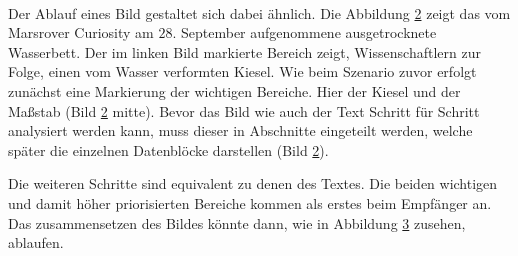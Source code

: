 \begin{figure}[H]
	\centering
	\hfill
	\\
	\label{fig:marsWaterResidue}
\end{figure}

Der Ablauf eines Bild gestaltet sich dabei ähnlich. Die Abbildung
\ref{fig:marsWaterResidue} zeigt das vom Marsrover \glqq Curiosity \grqq
am $28.$ September aufgenommene ausgetrocknete Wasserbett. Der im linken
Bild markierte Bereich zeigt, Wissenschaftlern zur Folge, einen vom Wasser
verformten Kiesel. Wie beim Szenario zuvor erfolgt zunächst eine Markierung der wichtigen
Bereiche. Hier der Kiesel und der Maßstab (Bild \ref{fig:marsWaterResidue}
mitte). Bevor das Bild wie auch der Text Schritt für Schritt analysiert werden
kann, muss dieser in Abschnitte eingeteilt werden, welche später die einzelnen
Datenblöcke darstellen (Bild \ref{fig:marsWaterResidue}).
 
\begin{figure}[H]
	\centering
	\hfill
	\hfill
	\label{fig:marsWaterResidue}
\end{figure}

Die weiteren Schritte sind equivalent zu denen des Textes. Die beiden wichtigen
und damit höher priorisierten Bereiche kommen als erstes beim Empfänger an. Das
zusammensetzen des Bildes könnte dann, wie in Abbildung
\ref{fig:marsWaterResidueEmpfaenger} zusehen, ablaufen.

\begin{figure}[H]
	\centering
	\hfill
	\hfill
	\label{fig:marsWaterResidueEmpfaenger}
\end{figure}
